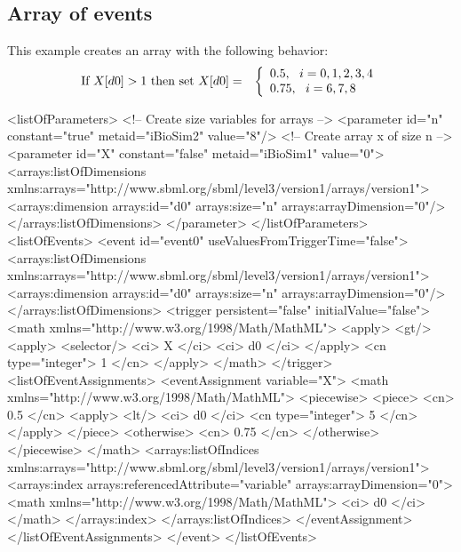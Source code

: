 \subsection{Array of events}

This example creates an \Event array with the following behavior:
\begin{eqnarray*}
\textup{If }X[d0] > 1\textup{ then set }X[d0] & = & \left\{ \begin{array}{l}
0.5,~~i = 0, 1, 2, 3, 4 \\
0.75,~~i = 6, 7, 8
\end{array}
\right.
\end{eqnarray*}

\begin{example}
<listOfParameters>
    <!-- Create size variables for arrays -->
    <parameter id="n" constant="true" metaid="iBioSim2" value="8"/>
    <!-- Create array x of size n -->
    <parameter id="X" constant="false" metaid="iBioSim1" value="0">
        <arrays:listOfDimensions
            xmlns:arrays="http://www.sbml.org/sbml/level3/version1/arrays/version1">
            <arrays:dimension arrays:id="d0" arrays:size="n" arrays:arrayDimension="0"/>
        </arrays:listOfDimensions>
    </parameter>
</listOfParameters>
<listOfEvents>
    <event id="event0" useValuesFromTriggerTime="false">
        <arrays:listOfDimensions
            xmlns:arrays="http://www.sbml.org/sbml/level3/version1/arrays/version1">
            <arrays:dimension arrays:id="d0" arrays:size="n" arrays:arrayDimension="0"/>
        </arrays:listOfDimensions>
        <trigger persistent="false" initialValue="false">
            <math xmlns="http://www.w3.org/1998/Math/MathML">
                <apply>
                    <gt/>
                    <apply>
                        <selector/>
                        <ci> X </ci>
                        <ci> d0 </ci>
                    </apply>
                    <cn type="integer"> 1 </cn>
                </apply>
            </math>
        </trigger>
        <listOfEventAssignments>
            <eventAssignment variable="X">
                <math xmlns="http://www.w3.org/1998/Math/MathML">
                    <piecewise>
                        <piece>
                            <cn> 0.5 </cn>
                            <apply>
                                <lt/>
                                <ci> d0 </ci>
                                <cn type="integer"> 5 </cn>
                            </apply>
                        </piece>
                        <otherwise>
                            <cn> 0.75 </cn>
                        </otherwise>
                    </piecewise>
                </math>
                <arrays:listOfIndices
                    xmlns:arrays="http://www.sbml.org/sbml/level3/version1/arrays/version1">
                    <arrays:index arrays:referencedAttribute="variable" arrays:arrayDimension="0">
                        <math xmlns="http://www.w3.org/1998/Math/MathML">
                            <ci> d0 </ci>
                        </math>
                    </arrays:index>
                </arrays:listOfIndices>
            </eventAssignment>
        </listOfEventAssignments>
    </event>
</listOfEvents>
\end{example}


